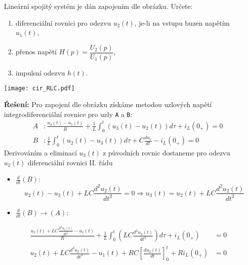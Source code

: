 \begin{example}Lineární spojitý systém je dán zapojením dle obrázku. Určete:
  \begin{enumerate}[noitemsep]
    \item diferenciální rovnici pro odezvu $u_2(t)$, je-li na vstupu buzen napětím $u_1(t)$,
    \item přenos napětí $H(p)=\dfrac{U_2(p)}{U_1(p)}$,
    \item impulsní odezvu $h(t)$.
  \end{enumerate}

   {\centering
    \captionsetup{type=figure}
    \texttt{[image: cir\_RLC.pdf]}
    \label{SAS:fig_RLC}
    \par}
  \textbf{Řešení:}\newline
  Pro zapojení dle obrázku získáme metodou uzlových napětí integrodiferenciální rov\-ni\-ce pro
  uzly \texttt{A} a \texttt{B}:
  \begin{align}\label{SAS:eq_RLC_basic_rces}
    A &:  \frac{u_3(t)-u_1(t)}{R}+\frac{1}{L}
    \int_0^t{(u_3(t)-u_2(t))}d\tau+i_L(0_+) = 0\,               \\ \nonumber
    B &:  \frac{1}{L}\int_0^t{(u_2(t)-u_3(t))}d\tau+C\frac{du_c}{dt}-i_L(0_+)        = 0
  \end{align}
  Derivováním a eliminací $u_3(t)$ z původních rovnic dostaneme pro odezvu $u_2(t)$ diferenciální
  rovnici II. řádu
  \begin{itemize}
    \item \(\frac{d}{dt}(B)\):
          \begin{equation*}
            u_2(t)-u_3(t)+LC\frac{d^2u_2(t)}{dt^2}
            =0\Rightarrow u_3(t)=u_2 (t)+LC\frac{d^2u_2(t)}{dt^2}
          \end{equation*}
    \item \(\frac{d}{dt}(B)\rightarrow(A)\):
  \end{itemize}
  \begin{align*}
    \frac{u_2(t)+LC\frac{d^2u_2(t)}{dt^2}-u_1(t)}{R}+
    \frac{1}{L}\int_0^t{(LC\frac{d^2u_2(t)}{dt^2})}d\tau+i_L(0_+) &=  0 \\
    u_2(t)+LC\frac{d^2u_2(t)}{dt^2}-u_1(t)+
    RC\left[\frac{du_2(t)}{dt}\right]_0^t+Ri_L(0_+)               &=  0
  \end{align*}

\end{example}
